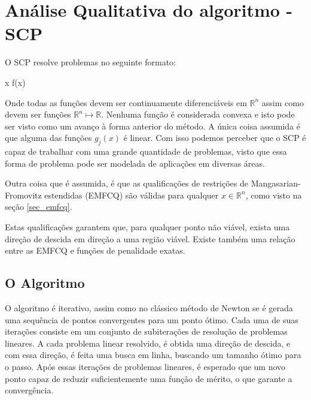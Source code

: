 \section{Análise Qualitativa do algoritmo - SCP}

O SCP resolve problemas no seguinte formato:

\vspace{-15pt}
\begin{mini!}
{x}{ f(x) \label{scp_obj}}{\label{prob_scp}}{}
\end{mini!}

Onde todas as funções devem ser continuamente diferenciáveis em \(\mathbb{R}^n\) assim como
devem ser funções \( \mathbb{R}^n \mapsto \mathbb{R} \). Nenhuma função é considerada convexa e isto
pode ser visto como um avanço à forma anterior do método. A única coisa assumida é que alguma das
funções \( g_j(x) \) é linear. Com isso podemos perceber que o SCP é capaz de trabalhar com uma
grande quantidade de problemas, visto que essa forma de problema pode ser modelada de aplicações
em diversas áreas.

Outra coisa que é assumida, é que as qualificações de restrições de Mangasarian-Fromovitz estendidas (EMFCQ)
\cite{di1994exact} são válidas para qualquer \( x \in \mathbb{R}^n \), como visto na seção \ref{sec_emfcq}.

Estas qualificações garantem que, para qualquer ponto não viável, exista uma
direção de descida em direção a uma região viável. Existe também uma relação entre as EMFCQ
e funções de penalidade exatas.


\subsection{O Algoritmo}
O algoritmo é iterativo, assim como no clássico método de Newton se é gerada
uma sequência de pontos convergentes para um ponto ótimo.
Cada uma de suas iterações consiste em um conjunto de subiterações de
resolução de problemas lineares. A cada problema linear resolvido, é obtida
uma direção de descida, e com essa direção, é feita uma busca em linha,
buscando um tamanho ótimo para o passo. Após essas iterações de problemas
lineares, é esperado que um novo ponto capaz de reduzir suficientemente uma
função de mérito, o que garante a convergência.




